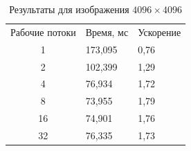 \begin{table}[H]\caption{Результаты для изображения $4096\times4096$}\label{tab:q}
\centering\begin{tabularx}{\textwidth}{|c|X|X|}\hline
Рабочие потоки & Время, мс & Ускорение\\\hhline{|=:=:=|}
1 & 173,095 & 0,76 \\\hline
2 & 102,399 & 1,29 \\\hline
4 & 76,934 & 1,72 \\\hline
8 & 73,955 & 1,79 \\\hline
16 & 74,901 & 1,76 \\\hline
32 & 76,335 & 1,73 \\\hline
\end{tabularx}\end{table}